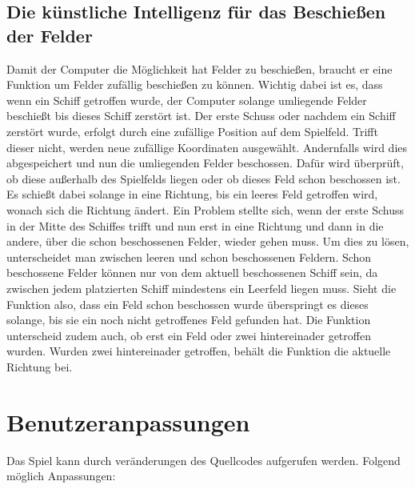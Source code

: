 \documentclass{llncs}
\begin{document}
\subsection{Die künstliche Intelligenz für das Beschießen der Felder}

Damit der Computer die Möglichkeit hat Felder zu beschießen, braucht er eine Funktion um Felder zufällig beschießen zu können. Wichtig dabei ist es, dass wenn ein Schiff getroffen wurde, der Computer solange umliegende Felder beschießt
bis dieses Schiff zerstört ist. Der erste Schuss oder nachdem ein Schiff zerstört wurde, erfolgt durch eine zufällige Position auf dem Spielfeld. Trifft dieser nicht, werden neue zufällige Koordinaten ausgewählt. Andernfalls
wird dies abgespeichert und nun die umliegenden Felder beschossen. Dafür wird überprüft, ob diese außerhalb des Spielfelds liegen oder ob dieses Feld schon beschossen ist. Es schießt dabei solange in eine Richtung, bis
ein leeres Feld getroffen wird, wonach sich die Richtung ändert. Ein Problem stellte sich, wenn der erste Schuss in der Mitte des Schiffes trifft und nun erst in eine Richtung und dann in die andere, über die schon beschossenen Felder,
wieder gehen muss. Um dies zu lösen, unterscheidet man zwischen leeren und schon beschossenen Feldern. Schon beschossene Felder können nur von dem aktuell beschossenen Schiff sein, da zwischen jedem platzierten Schiff mindestens
ein Leerfeld liegen muss. Sieht die Funktion also, dass ein Feld schon beschossen wurde überspringt es dieses solange, bis sie ein noch nicht getroffenes Feld gefunden hat. Die Funktion unterscheid zudem auch, ob erst ein Feld oder zwei hintereinader 
getroffen wurden. Wurden zwei hintereinader getroffen, behält die Funktion die aktuelle Richtung bei.

\section{Benutzeranpassungen}

Das Spiel kann durch veränderungen des Quellcodes aufgerufen werden. Folgend möglich Anpassungen:
\end{document}
